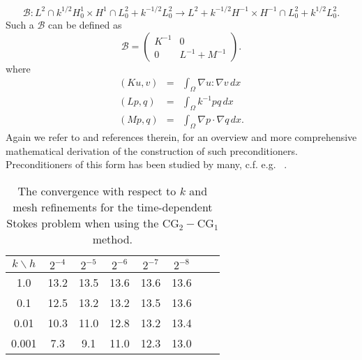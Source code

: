 \[
\mathcal{B}: L^2 \cap k^{1/2} H^1_0 \times H^1 \cap L_0^2 + k^{-1/2} L_0^2 \rightarrow 
L^2 + k^{-1/2} H^{-1} \times H^{-1} \cap L_0^2 + k^{1/2} L_0^2  .
\] 
Such a $\mathcal{B}$ can be defined as 
\[
\mathcal{B} 
= 
\begin{pmatrix} K^{-1} & 0 \\ 0 & L^{-1} + M^{-1} \end{pmatrix}.
\]
where 
\begin{eqnarray}
(K u, v) &=& \int_\Omega \nabla u: \nabla v \, dx \\ 
(L p, q) &=& \int_\Omega k^{-1} p q \, dx \\   
(M p, q) &=& \int_\Omega \nabla p \cdot  \nabla q \, dx .   
\end{eqnarray}
Again we refer to \citep{MardalWinther11} and references therein,  for an overview and more comprehensive mathematical derivation 
of the construction of such preconditioners.  
Preconditioners of this form has been studied by many, c.f. e.g.
~\citep{CahouetChabard1988,ElmanSilvesterWathen2005,MardalWinther2004,MardalWinther11,Turek1999}. 

\begin{table}
\begin{center}
\begin{tabular}{|c|c||c|c|c|c|c|c|}
\hline
$k\backslash h$ & $2^{-4}$ & $2^{-5}$ & $2^{-6}$ & $2^{-7}$ & $2^{-8}$ \\ \hline\hline
1.0 & 13.2 & 13.5 & 13.6 & 13.6 & 13.6 \\ \hline 
0.1 & 12.5 & 13.2 & 13.2 & 13.5 & 13.6 \\ \hline 
0.01 & 10.3 & 11.0 & 12.8 & 13.2 & 13.4 \\ \hline 
0.001 & 7.3 & 9.1 & 11.0 & 12.3  & 13.0 \\ \hline 
\end{tabular}
\caption{The convergence with respect to $k$ and mesh refinements for the time-dependent Stokes problem 
when using the $\mathrm{CG}_2-\mathrm{CG}_1$ method.}\label{timestokes:ex} 
\end{center}
\end{table}

